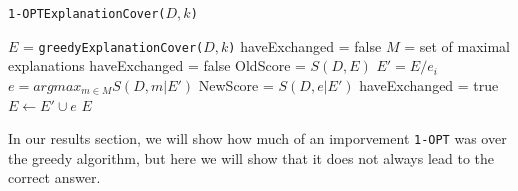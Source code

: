 \documentclass[11pt,twocolumn]{article}
\begin{document}
\begin{algorithm}
  \caption{ \texttt{1-OPTExplanationCover($D,k$)} }
  \label{alg:1-OPT}
  \begin{algorithmic}
    \State $E$ =  \texttt{greedyExplanationCover($D,k$)}
    \State haveExchanged = false
    \State $M$ = set of maximal explanations
    \Repeat
    \State haveExchanged = false
    \State OldScore = $S(D,E)$
    \State $E' = E / e_i$
    \State $e = argmax_{m \in M} S(D,m|E')$
    \State NewScore = $S(D,e|E')$
    \State haveExchanged = true
    \State $E \leftarrow E' \cup e$
    \EndIf
    \EndFor
    \State \Return $E$
  \end{algorithmic}
\end{algorithm}

In our results section, we will show how much of an imporvement \texttt{1-OPT} was over the greedy algorithm, but here we will show that it does not always lead to the correct answer.
\end{document}
